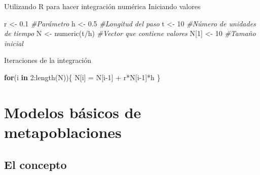 \documentclass[
  11pt,
  ignorenonframetext,
]{beamer}
\newenvironment{Shaded}{}{}
\newcommand{\CommentTok}[1]{\textcolor[rgb]{0.38,0.63,0.69}{\textit{#1}}}
\newcommand{\ControlFlowTok}[1]{\textcolor[rgb]{0.00,0.44,0.13}{\textbf{#1}}}
\newcommand{\DecValTok}[1]{\textcolor[rgb]{0.25,0.63,0.44}{#1}}
\newcommand{\FloatTok}[1]{\textcolor[rgb]{0.25,0.63,0.44}{#1}}
\newcommand{\FunctionTok}[1]{\textcolor[rgb]{0.02,0.16,0.49}{#1}}
\newcommand{\NormalTok}[1]{#1}
\newcommand{\OtherTok}[1]{\textcolor[rgb]{0.00,0.44,0.13}{#1}}
\newcommand{\SpecialCharTok}[1]{\textcolor[rgb]{0.25,0.44,0.63}{#1}}
\begin{document}
\begin{frame}[fragile]{Utilizando R para hacer integración numérica}
Iniciando valores

\begin{Shaded}
\begin{Highlighting}[]
\NormalTok{r }\OtherTok{\textless{}{-}} \FloatTok{0.1} \CommentTok{\#Parámetro}
\NormalTok{h }\OtherTok{\textless{}{-}} \FloatTok{0.5} \CommentTok{\#Longitud del paso}
\NormalTok{t }\OtherTok{\textless{}{-}} \DecValTok{10} \CommentTok{\#Número de unidades de tiempo}
\NormalTok{N }\OtherTok{\textless{}{-}} \FunctionTok{numeric}\NormalTok{(t}\SpecialCharTok{/}\NormalTok{h) }\CommentTok{\#Vector que contiene valores}
\NormalTok{N[}\DecValTok{1}\NormalTok{] }\OtherTok{\textless{}{-}} \DecValTok{10} \CommentTok{\#Tamaño inicial}
\end{Highlighting}
\end{Shaded}

Iteraciones de la integración

\begin{Shaded}
\begin{Highlighting}[]
\ControlFlowTok{for}\NormalTok{(i }\ControlFlowTok{in} \DecValTok{2}\SpecialCharTok{:}\FunctionTok{length}\NormalTok{(N))\{}
\NormalTok{      N[i] }\OtherTok{=}\NormalTok{ N[i}\DecValTok{{-}1}\NormalTok{] }\SpecialCharTok{+}\NormalTok{ r}\SpecialCharTok{*}\NormalTok{N[i}\DecValTok{{-}1}\NormalTok{]}\SpecialCharTok{*}\NormalTok{h}
\NormalTok{  \}}
\end{Highlighting}
\end{Shaded}
\end{frame}

\hypertarget{modelos-buxe1sicos-de-metapoblaciones}{%
\section{Modelos básicos de
metapoblaciones}\label{modelos-buxe1sicos-de-metapoblaciones}}

\hypertarget{el-concepto}{%
\subsection{El concepto}\label{el-concepto}}
\end{document}
